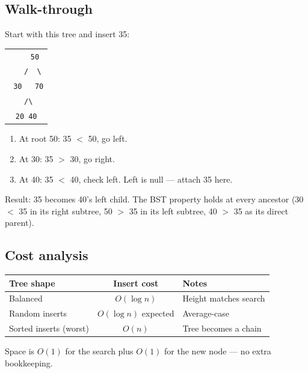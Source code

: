 \documentclass[11pt]{article}
\begin{document}
\subsection*{Walk-through}

Start with this tree and insert 35:

\begin{center}
\begin{tabular}{c}
\texttt{\ \ \ \ 50} \\
\texttt{\ \ \ /\ \ \textbackslash{}} \\
\texttt{\ 30\ \ \ 70} \\
\texttt{\ /\textbackslash{}} \\
\texttt{20\ 40} \\
\end{tabular}
\end{center}

\begin{enumerate}[leftmargin=*]
    \item At root 50: 35 $<$ 50, go left.
    \item At 30: 35 $>$ 30, go right.
    \item At 40: 35 $<$ 40, check left. Left is null --- attach 35 here.
\end{enumerate}

Result: 35 becomes 40's left child. The BST property holds at
every ancestor (30 $<$ 35 in its right subtree, 50 $>$ 35 in
its left subtree, 40 $>$ 35 as its direct parent).

\subsection*{Cost analysis}

\begin{center}
\begin{tabular}{|l|c|l|}
\hline
\textbf{Tree shape} & \textbf{Insert cost} & \textbf{Notes} \\
\hline
Balanced            & $O(\log n)$ & Height matches search \\
Random inserts      & $O(\log n)$ expected & Average-case \\
Sorted inserts (worst) & $O(n)$   & Tree becomes a chain \\
\hline
\end{tabular}
\end{center}

Space is $O(1)$ for the search plus $O(1)$ for the new node ---
no extra bookkeeping.
\end{document}
